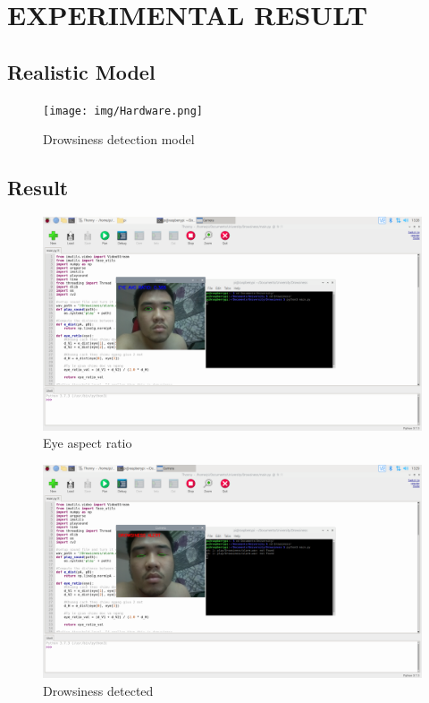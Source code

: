 \chapter{EXPERIMENTAL RESULT}

\renewcommand{\headrulewidth}{0.5pt}
\renewcommand{\footrulewidth}{0.5pt}
\thispagestyle{plain}
\pagestyle{fancy}
\fancyhf{}
\raggedright
{}

\justifying

\section{Realistic Model}
    \begin{figure}[H]
        \centering
        \texttt{[image: img/Hardware.png]}
        \caption{Drowsiness detection model}
    \end{figure}
\section{Result}
    \begin{figure}[H]
        \centering
        \includegraphics[width=0.8\linewidth]{img/run.png}
        \caption{Eye aspect ratio}
    \end{figure}
    \begin{figure}[H]
        \centering
        \includegraphics[width=0.8\linewidth]{img/result.png}
        \caption{Drowsiness detected}
    \end{figure}